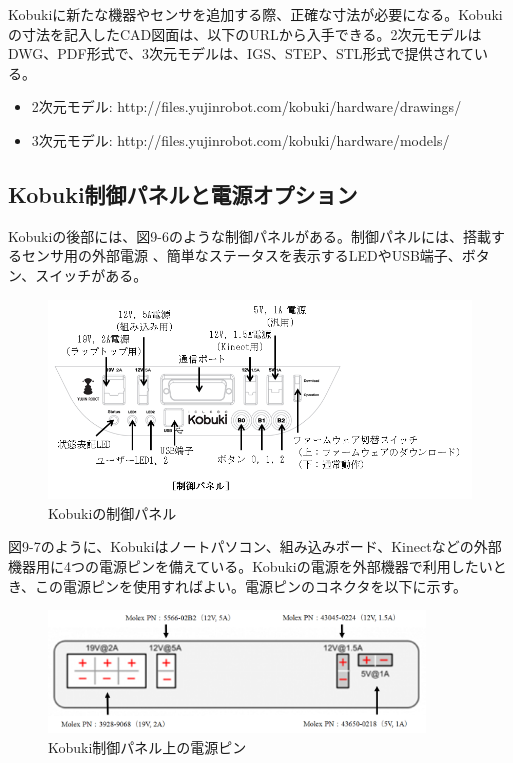 \begin{exercise}[KobukiのCAD図面の入手方法]
  Kobukiに新たな機器やセンサを追加する際、正確な寸法が必要になる。Kobukiの寸法を記入したCAD図面は、以下のURLから入手できる。2次元モデルはDWG、PDF形式で、3次元モデルは、IGS、STEP、STL形式で提供されている。
  \begin{itemize}
    \item  2次元モデル:  http://files.yujinrobot.com/kobuki/hardware/drawings/
    \item  3次元モデル:  http://files.yujinrobot.com/kobuki/hardware/models/
  \end{itemize}
\end{exercise}

\subsection{Kobuki制御パネルと電源オプション}

Kobukiの後部には、図9-6のような制御パネルがある。制御パネルには、搭載するセンサ用の外部電源  、簡単なステータスを表示するLEDやUSB端子、ボタン、スイッチがある。

\begin{figure}[htp]
  \centering
  \includegraphics[width=12cm]{pictures/chapter9/pic_09_06.png}
  \caption{Kobukiの制御パネル}
\end{figure}

図9-7のように、Kobukiはノートパソコン、組み込みボード、Kinectなどの外部機器用に4つの電源ピンを備えている。Kobukiの電源を外部機器で利用したいとき、この電源ピンを使用すればよい。電源ピンのコネクタを以下に示す。

\begin{figure}[htp]
  \centering
  \includegraphics[width=10cm]{pictures/chapter9/pic_09_07.png}
  \caption{Kobuki制御パネル上の電源ピン}
\end{figure}

